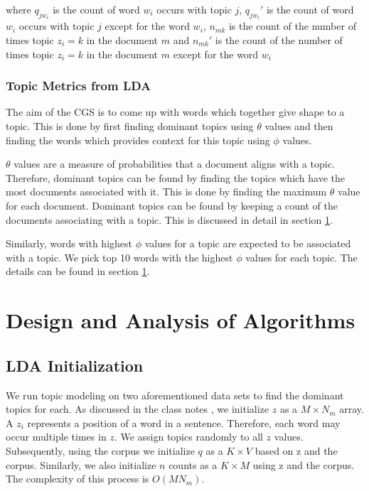 \documentclass[11pt,a4paper,oneside]{article}
\begin{document}
where $q_{j w_i}$ is the count of word $w_i$ occurs with topic $j$, $q_{j w_i}'$ is the count of word $w_i$ occurs with topic $j$ except for the word $w_i$, $n_{mk}$ is the count of the number of times topic $z_i = k$ in the document $m$ and $n_{mk}'$ is the count of the number of times topic $z_i = k$ in the document $m$ except for the word $w_i$ 

\subsubsection{Topic Metrics from LDA}
The aim of the CGS is to come up with words which together give shape to a topic. This is done by first finding dominant topics using $\theta$ values and then finding the words which provides context for this topic using $\phi$ values. 

$\theta$ values are a measure of probabilities that a document aligns with a topic. Therefore, dominant topics can be found by finding the topics which have the most documents associated with it. This is done by finding the maximum $\theta$ value for each document. Dominant topics can be found by keeping a count of the documents associating with a topic. This is discussed in detail in section \ref{sec:Algorithms}.

Similarly, words with highest $\phi$ values for a topic are expected to be associated with a topic. We pick top 10 words with the highest $\phi$ values for each topic. The details can be found in section \ref{sec:Algorithms}.

\section{Design and Analysis of Algorithms}
\label{sec:Algorithms}

\subsection{LDA Initialization}
We run topic modeling on two aforementioned data sets to find the dominant topics for each. As discussed in the class notes \cite{classNotes}, we initialize $z$ as a $M \times N_m$ array. A $z_i$ represents a position of a word in a sentence. Therefore, each word may occur multiple times in $z$. We assign topics randomly to all $z$ values.  Subsequently, using the corpus we initialize $q$ as a $K \times V$ based on z and the corpus. Similarly, we also initialize $n$ counts as a $K \times M$ using z and the corpus. The complexity of this process is $O(MN_m)$.
\end{document}
